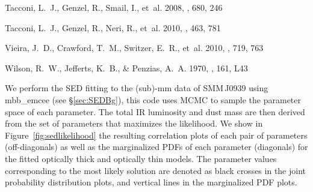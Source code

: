 \documentclass[twocolumn,apj,numberedappendix]{emulateapj}
\begin{document}
\begin{thebibliography}{}
{Tacconi}, L.~J., {Genzel}, R., {Smail}, I., {et~al.} 2008, \apj, 680, 246

{Tacconi}, L.~J., {Genzel}, R., {Neri}, R., {et~al.} 2010, \nat, 463, 781

{Vieira}, J.~D., {Crawford}, T.~M., {Switzer}, E.~R., {et~al.} 2010, \apj, 719,
  763

{Wilson}, R.~W., {Jefferts}, K.~B., \& {Penzias}, A.~A. 1970, \apjl, 161, L43

\end{thebibliography}

\appendix
We perform the SED fitting to the (sub)-mm data of SMM\,J0939 using {\sc mbb\_emcee} (see \S \ref{sec:SEDBg}), this code uses MCMC to sample the parameter space of each parameter. The total IR luminosity and dust mass are then derived from the set of parameters that maximizes the likelihood.
We show in Figure~\ref{fig:sedlikelihood} the resulting correlation plots of each pair of parameters (off-diagonals) as well as the marginalized PDFs of each parameter (diagonals) for the fitted optically thick and optically thin models.
The parameter values corresponding to the most likely solution are denoted as black crosses in the joint probability distribution plots, and vertical lines in the marginalized PDF plots. \par
\end{document}
